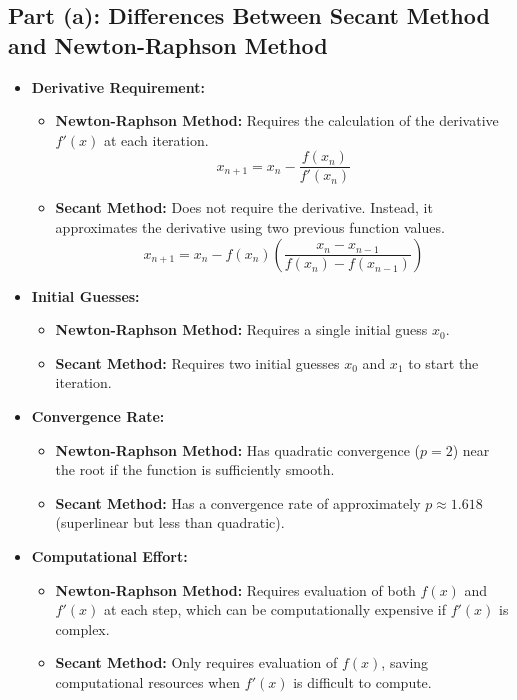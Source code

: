 \documentclass[12pt]{article}
\begin{document}
\subsection*{Part (a): Differences Between Secant Method and Newton-Raphson Method}

\begin{itemize}
    \item \textbf{Derivative Requirement:}
    \begin{itemize}
        \item \textbf{Newton-Raphson Method:} Requires the calculation of the derivative \( f'(x) \) at each iteration.
        \[
        x_{n+1} = x_n - \frac{f(x_n)}{f'(x_n)}
        \]
        \item \textbf{Secant Method:} Does not require the derivative. Instead, it approximates the derivative using two previous function values.
        \[
        x_{n+1} = x_n - f(x_n) \left( \frac{x_n - x_{n-1}}{f(x_n) - f(x_{n-1})} \right)
        \]
    \end{itemize}
    
    \item \textbf{Initial Guesses:}
    \begin{itemize}
        \item \textbf{Newton-Raphson Method:} Requires a single initial guess \( x_0 \).
        \item \textbf{Secant Method:} Requires two initial guesses \( x_0 \) and \( x_1 \) to start the iteration.
    \end{itemize}

    \item \textbf{Convergence Rate:}
    \begin{itemize}
        \item \textbf{Newton-Raphson Method:} Has quadratic convergence (\( p = 2 \)) near the root if the function is sufficiently smooth.
        \item \textbf{Secant Method:} Has a convergence rate of approximately \( p \approx 1.618 \) (superlinear but less than quadratic).
    \end{itemize}

    \item \textbf{Computational Effort:}
    \begin{itemize}
        \item \textbf{Newton-Raphson Method:} Requires evaluation of both \( f(x) \) and \( f'(x) \) at each step, which can be computationally expensive if \( f'(x) \) is complex.
        \item \textbf{Secant Method:} Only requires evaluation of \( f(x) \), saving computational resources when \( f'(x) \) is difficult to compute.
    \end{itemize}
\end{itemize}
\end{document}
